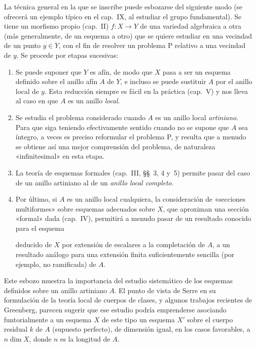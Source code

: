 La técnica general en la que se inscribe puede esbozarse del siguiente modo (se ofrecerá un ejemplo típico en el cap.~IX, al estudiar el grupo fundamental).
Se tiene un morfismo propio (cap.~II) $f:X\to Y$ de una variedad algebraica a otra (más generalmente, de un esquema a otro) que se quiere estudiar en una vecindad de un punto $y\in Y$, con el fin de resolver un problema P relativo a una vecindad de $y$.
Se procede por etapas sucesivas:
\begin{enumerate}
  \item[1\textsuperscript{o}] Se puede suponer que $Y$ es afín, de modo que $X$ pasa a ser un esquema definido sobre el anillo afín $A$ de $Y$, e incluso se puede sustituir $A$ por el anillo local de $y$.
  Esta reducción siempre es fácil en la práctica (cap.~V) y nos lleva al caso en que $A$ es un anillo \emph{local}.
  \item[2\textsuperscript{o}] Se estudia el problema considerado cuando $A$ es un anillo local \emph{artiniano}.
  Para que siga teniendo efectivamente sentido cuando no se supone que $A$ sea íntegro, a veces es preciso reformular el problema P, y resulta que a menudo se obtiene así una mejor comprensión del problema, de naturaleza «infinitesimal» en esta etapa.
  \item[3\textsuperscript{o}] La teoría de esquemas formales (cap.~III, \S\S~3, 4 y~5) permite pasar del caso de un anillo artiniano al de un \emph{anillo local completo}.
  \item[4\textsuperscript{o}] Por último, si $A$ es un anillo local cualquiera, la consideración de «secciones multiformes» sobre esquemas adecuados sobre $X$, que aproximan una sección «formal» dada (cap.~IV), permitirá a menudo pasar de un resultado conocido para el esquema

  deducido de $X$ por extensión de escalares a la completación de $A$, a un resultado análogo para una extensión finita suficientemente sencilla (por ejemplo, no ramificada) de $A$.
\end{enumerate}

Este esbozo muestra la importancia del estudio sistemático de los esquemas definidos sobre un anillo artiniano $A$.
El punto de vista de Serre en su formulación de la teoría local de cuerpos de clases, y algunos trabajos recientes de Greenberg, parecen sugerir que ese estudio podría emprenderse asociando funtorialmente a un esquema $X$ de este tipo un esquema $X'$ sobre el cuerpo residual $k$ de $A$ (supuesto perfecto), de dimensión igual, en los casos favorables, a $n\dim X$, donde $n$ es la longitud de $A$.

